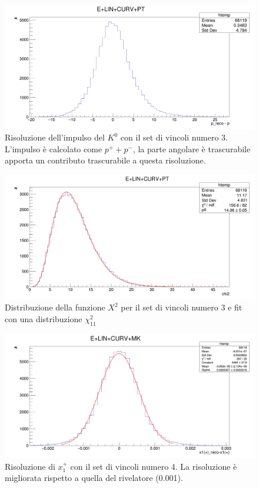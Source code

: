 \documentclass[8pt]{extarticle}
\begin{document}
\begin{figure}
	\begin{center}
		\includegraphics[scale=0.25]{set_3_p} 
		\caption{Risoluzione dell'impulso del $K^0$ con il set di vincoli numero 3. L'impulso è calcolato come $p^+ + p^-$, la parte angolare è trascurabile apporta un contributo trascurabile a questa risoluzione.}
		\label{fig:set_3_p}
	\end{center}
\end{figure}

\begin{figure}
	\begin{center}
		\includegraphics[scale=0.25]{set_3_chi2} 
		\caption{Distribuzione della funzione $X^2$ per il set di vincoli numero 3 e fit con una distribuzione $\chi^2_{11}$}
		\label{fig:set_3_chi2}
	\end{center}
\end{figure}

\begin{figure}
	\begin{center}
		\includegraphics[scale=0.25]{set_4_x} 
		\caption{Risoluzione di $x_1^+$ con il set di vincoli numero 4. La risoluzione è migliorata rispetto a quella del rivelatore (0.001).}
		\label{fig:set_4_x}
	\end{center}
\end{figure}
\end{document}
